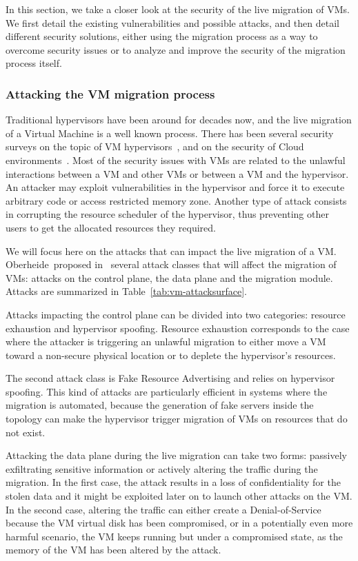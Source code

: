 In this section, we take a closer look at the security of the live migration of VMs.
We first detail the existing vulnerabilities and possible attacks, and then detail different security solutions, either using the migration process as a way to overcome security issues or to analyze and improve the security of the migration process itself.

\subsubsection{Attacking the VM migration process}
Traditional hypervisors have been around for decades now, and the live migration of a Virtual Machine is a well known process. There has been several security surveys on the topic of VM hypervisors~\cite{Reuben2007,Rehman2013,Sahoo2010,Perez-Botero2013}, and on the security of Cloud environments~\cite{cloudenvironmentsecuritysurvey-fernandes2014}.
Most of the security issues with VMs are related to the unlawful interactions between a VM and other VMs or between a VM and the hypervisor.
An attacker may exploit vulnerabilities in the hypervisor and force it to execute arbitrary code or access restricted memory zone.
Another type of attack consists in corrupting the resource scheduler of the hypervisor, thus preventing other users to get the allocated resources they required.

We will focus here on the attacks that can impact the live migration of a VM.
Oberheide~\etal proposed in~\cite{empirical-oberheide2008} several attack classes that will affect the migration of VMs: attacks on the control plane, the data plane and the migration module.
Attacks are summarized in Table~\ref{tab:vm-attacksurface}.

Attacks impacting the control plane can be divided into two categories: resource exhaustion and hypervisor spoofing. Resource exhaustion corresponds to the case where the attacker is triggering an unlawful migration to either move a VM toward a non-secure physical location or to deplete the hypervisor's resources.

The second attack class is Fake Resource Advertising and relies on hypervisor spoofing. This kind of attacks are particularly efficient in systems where the migration is automated, because the generation of fake servers inside the topology can make the hypervisor trigger migration of VMs on resources that do not exist.

Attacking the data plane during the live migration can take two forms: passively exfiltrating sensitive information or actively altering the traffic during the migration.
In the first case, the attack results in a loss of confidentiality for the stolen data and it might be exploited later on to launch other attacks on the VM.
In the second case, altering the traffic can either create a Denial-of-Service because the VM virtual disk has been compromised, or in a potentially even more harmful scenario, the VM keeps running but under a compromised state, as the memory of the VM has been altered by the attack.

